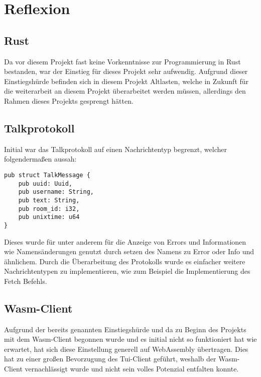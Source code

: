 \chapter{Reflexion}
\section{Rust}
Da vor diesem Projekt fast keine Vorkenntnisse zur Programmierung in Rust bestanden, war der Einstieg für dieses Projekt sehr aufwendig. Aufgrund dieser Einstiegshürde befinden sich in diesem Projekt Altlasten, welche in Zukunft für die weiterarbeit an diesem Projekt überarbeitet werden müssen, allerdings den Rahmen dieses Projekts gesprengt hätten.

\section{Talkprotokoll}
Initial war das Talkprotokoll auf einen Nachrichtentyp begrenzt, welcher folgendermaßen aussah:

\begin{lstlisting}[caption=Altes Kommunikationsprotokoll, label=Altes_Kommunikationsprotokoll, basicstyle=\ttfamily\scriptsize]
pub struct TalkMessage {
    pub uuid: Uuid,
    pub username: String,
    pub text: String,
    pub room_id: i32,
    pub unixtime: u64
}
\end{lstlisting}
Dieses wurde für unter anderem für die Anzeige von Errors und Informationen wie Namensänderungen genutzt durch setzen des Namens zu Error oder Info und ähnlichem. Durch die Überarbeitung des Protokolls wurde es einfacher weitere Nachrichtentypen zu implementieren, wie zum Beispiel die Implementierung des Fetch Befehls.

\section{Wasm-Client}
Aufgrund der bereits genannten Einstiegshürde und da zu Beginn des Projekts mit dem Wasm-Client begonnen wurde und es initial nicht so funktioniert hat wie erwartet, hat sich diese Einstellung generell auf WebAssembly übertragen. Dies hat zu einer großen Bevorzugung des Tui-Client geführt, weshalb der Wasm-Client vernachlässigt wurde und nicht sein volles Potenzial entfalten konnte.
